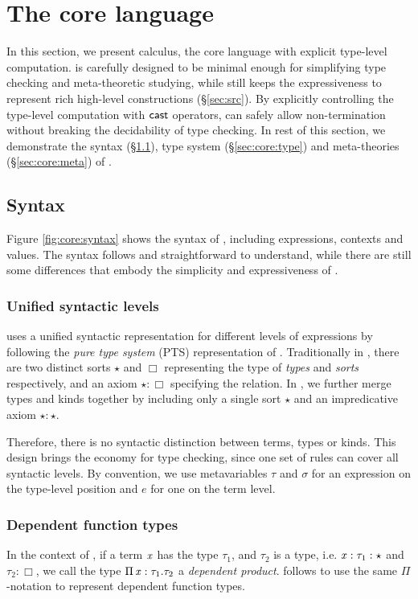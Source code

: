 \section{The core language}\label{sec:core}

In this section, we present \name calculus, the core language with explicit type-level computation. \name is carefully designed to be minimal enough for simplifying type checking and meta-theoretic studying, while still keeps the expressiveness to represent rich high-level constructions (\S \ref{sec:src}). By explicitly controlling the type-level computation with $\mathsf{cast}$ operators, \name can safely allow non-termination without breaking the decidability of type checking. In rest of this section, we demonstrate the syntax (\S \ref{sec:core:syn}), type system (\S \ref{sec:core:type}) and meta-theories (\S \ref{sec:core:meta}) of \name.

\subsection{Syntax}\label{sec:core:syn}
Figure \ref{fig:core:syntax} shows the syntax of \name, including expressions, contexts and values. The syntax follows \cc and straightforward to understand, while there are still some differences that embody the simplicity and expressiveness of \name.

\subsubsection{Unified syntactic levels}
\name uses a unified syntactic representation for different levels of expressions by following the \emph{pure type system} (PTS) representation of \cc. Traditionally in \cc, there are two distinct sorts $\star$ and $\Box$ representing the type of \emph{types} and \emph{sorts} respectively, and an axiom $\star:\Box$ specifying the relation. In \name, we further merge types and kinds together by including only a single sort $\star$ and an impredicative axiom $\star:\star$. 

Therefore, there is no syntactic distinction between terms, types or kinds. This design brings the economy for type checking, since one set of rules can cover all syntactic levels. By convention, we use metavariables $\tau$ and $\sigma$ for an expression on the type-level position and $e$ for one on the term level.

\subsubsection{Dependent function types}
In the context of \cc, if a term $\mathit{x}$ has the type $\tau_{{\mathrm{1}}}$, and $\tau_{{\mathrm{2}}}$ is a type, i.e. $\mathit{x}:\tau_{{\mathrm{1}}}:\star$ and $\tau_{{\mathrm{2}}}:\Box$, we call the type $\Pi \, \mathit{x}  :  \tau_{{\mathrm{1}}}  .  \tau_{{\mathrm{2}}}$ a \emph{dependent product}. \name follows \cc to use the same $ \Pi $-notation to represent dependent function types.

